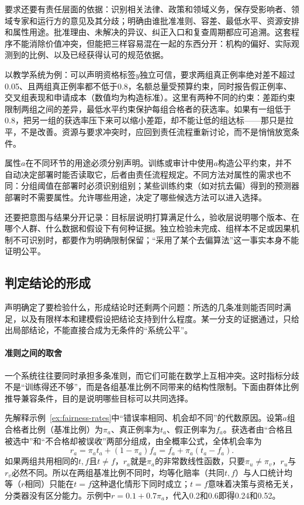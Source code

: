 要求还要有责任层面的依据：识别相关法律、政策和领域义务，保存受影响者、领域专家和运行方的意见及其分歧；明确由谁批准准则、容差、最低水平、资源安排和属性用途。批准理由、未解决的异议、纠正入口和复查周期都应可追溯。这套程序不能消除价值冲突，但能把三样容易混在一起的东西分开：机构的偏好、实际观测到的比例、以及已经获得认可的规范依据。

以教学系统为例：可以声明资格标签$y$独立可信，要求两组真正例率绝对差不超过0.05、且两组真正例率都不低于0.8，名额总量受预算约束，同时报告假正例率、交叉组表现和申请成本（数值均为构造标准）。这里有两种不同的约束：差距约束限制两组之间的差异，最低水平约束保护每组合格者的获选率。如果有一组低于0.8，把另一组的获选率压下来可以缩小差距，却不能让低的组达标——那只是拉平，不是改善。资源与要求冲突时，应回到责任流程重新讨论，而不是悄悄放宽条件。

属性$a$在不同环节的用途必须分别声明。训练或审计中使用$a$构造公平约束，并不自动决定部署时能否读取它，后者由责任流程规定。不同方法对属性的需求也不同：分组阈值在部署时必须识别组别；某些训练约束（如对抗去偏）得到的预测器部署时不需要属性。允许哪些用途，决定了哪些候选方法可以进入选择。

还要把意图与结果分开记录：目标层说明打算满足什么，验收层说明哪个版本、在哪个人群、什么数据和假设下有何种证据。独立检验未完成、组样本不足或因果机制不可识别时，都要作为明确限制保留；“采用了某个去偏算法”这一事实本身不能证明公平。

\subsection{判定结论的形成}
\label{sec:fairness-compatibility}

声明确定了要检验什么，形成结论时还剩两个问题：所选的几条准则能否同时满足，以及有限样本和建模假设把结论支持到什么程度。某一分支的证据通过，只给出局部结论，不能直接合成为无条件的“系统公平”。

\paragraph{准则之间的取舍}

一个系统往往要同时承担多条准则，而它们可能在数学上互相冲突。这时指标分歧不是“训练得还不够”，而是各组基准比例不同带来的结构性限制。下面由群体比例推导兼容条件，目的是说明哪些目标可以共同选择。

先解释示例~\ref{ex:fairness-rates}中“错误率相同、机会却不同”的代数原因。设第$a$组合格者比例（基准比例）为$\pi_a$、真正例率为$t_a$、假正例率为$f_a$。获选者由“合格且被选中”和“不合格却被误收”两部分组成，由全概率公式，全体机会率为
\[
 r_a=\pi_a t_a+(1-\pi_a)f_a=f_a+\pi_a(t_a-f_a).
\]
如果两组共用相同的$t,f$且$t\ne f$，$r_a$就是$\pi_a$的非常数线性函数，只要$\pi_u\ne\pi_v$，$r_u$与$r_v$必然不同。所以在两组基准比例不同时，均等化赔率（共同$t,f$）与人口统计均等（$r$相同）只能在$t=f$这种退化情形下同时成立；$t=f$意味着决策与资格无关，分类器没有区分能力。示例中$r=0.1+0.7\pi_a$，代入0.2和0.6即得0.24和0.52。

